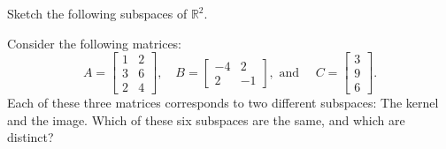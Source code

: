 \documentclass[addpoints]{exam}
\newcommand{\R}{\mathbb{R}}
\begin{document}
\begin{questions}

\question Sketch the following subspaces of $\R^2$.

\question[10] Consider the following matrices:
\[A = \begin{bmatrix} 1 & 2 \\ 3 & 6 \\ 2 & 4 \end{bmatrix}, \quad
B = \begin{bmatrix} -4 & 2 \\ 2 & -1 \end{bmatrix},\text{ and }\quad
C = \begin{bmatrix} 3 \\ 9 \\ 6 \end{bmatrix}.\]
Each of these three matrices corresponds to two different subspaces: The kernel and the image. Which of these six subspaces are the same, and which are distinct?


\end{questions}
\end{document}
